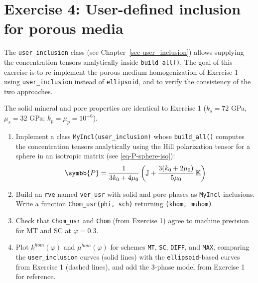 \documentclass[
  a4paper,
  numbers=noendperiod,
  DIV=12]{scrreprt}
\newcommand{\uuuu}[1]{{\symbb{{#1}}}}
\begin{document}
\section{Exercise 4: User-defined inclusion for porous
media}\label{sec-exo-user-inclusion}

\begin{tcolorbox}[enhanced jigsaw, arc=.35mm, bottomrule=.15mm, bottomtitle=1mm, breakable, colback=white, colbacktitle=quarto-callout-caution-color!10!white, colframe=quarto-callout-caution-color-frame, coltitle=black, left=2mm, leftrule=.75mm, opacityback=0, opacitybacktitle=0.6, rightrule=.15mm, title={Exercise}, titlerule=0mm, toprule=.15mm, toptitle=1mm]

The \texttt{user\_inclusion} class (see
Chapter~\ref{sec-user_inclusion}) allows supplying the concentration
tensors analytically inside \texttt{build\_all()}. The goal of this
exercise is to re-implement the porous-medium homogenization of Exercise
1 using \texttt{user\_inclusion} instead of \texttt{ellipsoid}, and to
verify the consistency of the two approaches.

The solid mineral and pore properties are identical to Exercise 1
(\(k_s=72\) GPa, \(\mu_s=32\) GPa; \(k_p=\mu_p=10^{-6}\)).

\begin{enumerate}
\def\labelenumi{\arabic{enumi}.}
\item
  Implement a class \texttt{MyIncl(user\_inclusion)} whose
  \texttt{build\_all()} computes the concentration tensors analytically
  using the Hill polarization tensor for a sphere in an isotropic matrix
  (see \ref{eq-P-sphere-iso}):
  \[\uuuu{P} = \frac{1}{3k_0+4\mu_0}\left(\mathbb{J}+\frac{3(k_0+2\mu_0)}{5\mu_0}\,\mathbb{K}\right)\]
\item
  Build an \texttt{rve} named \texttt{ver\_usr} with solid and pore
  phases as \texttt{MyIncl} inclusions. Write a function
  \texttt{Chom\_usr(phi,\ sch)} returning \texttt{(khom,\ muhom)}.
\item
  Check that \texttt{Chom\_usr} and \texttt{Chom} (from Exercise 1)
  agree to machine precision for MT and SC at \(\varphi=0.3\).
\item
  Plot \(k^{hom}(\varphi)\) and \(\mu^{hom}(\varphi)\) for schemes
  \texttt{MT}, \texttt{SC}, \texttt{DIFF}, and \texttt{MAX}, comparing
  the \texttt{user\_inclusion} curves (solid lines) with the
  \texttt{ellipsoid}-based curves from Exercise 1 (dashed lines), and
  add the 3-phase model from Exercise 1 for reference.
\end{enumerate}


\end{tcolorbox}
\end{document}
